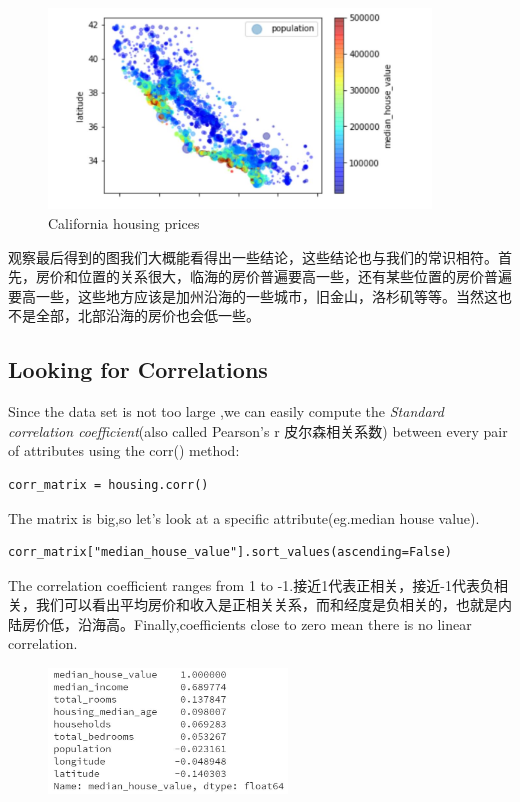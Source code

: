 \documentclass[UTF8]{ctexart}
\begin{document}
\begin{figure}[H]
\centering
\includegraphics[width = 4in]{Housing_price_pic.JPG}
\caption{California housing prices}
\end{figure}

观察最后得到的图我们大概能看得出一些结论，这些结论也与我们的常识相符。首先，房价和位置的关系很大，临海的房价普遍要高一些，还有某些位置的房价普遍要高一些，这些地方应该是加州沿海的一些城市，旧金山，洛杉矶等等。当然这也不是全部，北部沿海的房价也会低一些。

\subsection{Looking for Correlations}

 Since the data set is not too large ,we can easily compute the \emph{Standard correlation coefficient}(also called Pearson's r 皮尔森相关系数) between every pair of attributes using the corr() method:

\begin{lstlisting}
corr_matrix = housing.corr()
\end{lstlisting}

The matrix is big,so let's look at a specific attribute(eg.median house value).
\begin{lstlisting}
corr_matrix["median_house_value"].sort_values(ascending=False)
\end{lstlisting}

The correlation coefficient ranges from 1 to -1.接近1代表正相关，接近-1代表负相关，我们可以看出平均房价和收入是正相关关系，而和经度是负相关的，也就是内陆房价低，沿海高。Finally,coefficients close to zero mean there is no linear correlation.

\begin{figure}[H]
\centering
\includegraphics[width = 2.5in]{pearson_r.JPG}
\end{figure}
\end{document}
